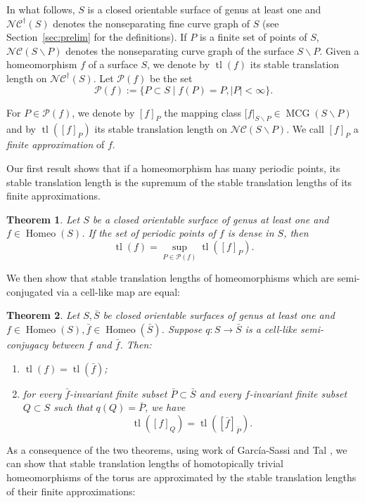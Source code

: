 \documentclass{amsart}
\newcommand{\Pf}{\mathcal{P}}
\newcommand{\st}{\;|\;}
\newcommand{\NC}{\mathcal{NC}}
\newcommand{\NCdagger}{\NC^\dagger}
\DeclareMathOperator{\Homeo}{Homeo}
\DeclareMathOperator{\mcg}{MCG}
\newcommand{\tl}[1]{\operatorname{tl}(#1)}
\newcommand{\ssm}{\smallsetminus}
\newtheorem{thm}{Theorem}[section]
\theoremstyle{definition}
\begin{document}
In what follows, \(S\) is a closed orientable surface of genus at least one and \(\NCdagger(S)\) denotes the nonseparating fine curve graph of \(S\) (see Section~\ref{sec:prelim} for the definitions). If \(P\) is a finite set of points of \(S\), \(\NC(S\ssm P)\) denotes the nonseparating curve graph of the surface \(S\ssm P\). Given a homeomorphism \(f\) of a surface \(S\), we denote by \(\tl{f}\) its stable translation length on \(\NCdagger(S)\). Let \(\Pf(f)\) be the set
\[\Pf(f):=\{P\subset S\st f(P)=P, |P|<\infty\}.\]

For \(P\in\Pf(f)\), we denote by \([f]_P\) the mapping class \([f|_{S\ssm P}\in\mcg(S\ssm P)\) and by \(\tl{[f]_{P}}\) its stable translation length on \(\NC(S\ssm P)\). We call \([f]_P\) a \emph{finite approximation} of \(f\).

Our first result shows that if a homeomorphism has many periodic points, its stable translation length is the supremum of the stable translation lengths of its finite approximations.

\begin{thm}\label{thm:dense}
Let \(S\) be a closed orientable surface of genus at least one and \(f\in\Homeo(S)\). If the set of periodic points of \(f\) is dense in \(S\), then 
    \[\tl{f}=\sup_{P\in\Pf(f)}\tl{[f]_{P}}.\]
\end{thm}

We then show that stable translation lengths of homeomorphisms which are semi-conjugated via a cell-like map are equal:

\begin{thm}    \label{thm:semi-conjugacy}
Let \(S,\bar{S}\) be closed orientable surfaces of genus at least one and \(f\in\Homeo(S), \bar{f}\in\Homeo(\bar{S})\). Suppose \(q:S\to \bar{S}\) is a cell-like semi-conjugacy between \(f\) and \(\bar{f}\). Then:
    \begin{enumerate}
        \item \(\tl{f}=\tl{\bar{f}}\);
        \item for every \(\bar{f}\)-invariant finite subset \(\bar{P}\subset \bar{S}\) and every \(f\)-invariant  finite subset \(Q\subset S\) such that \(q(Q)=\bar{P}\), we have
    \[\tl{[f]_{Q}}=\tl{[\bar{f}]_{\bar{P}}}.\]
    \end{enumerate}
\end{thm}

As a consequence of the two theorems, using work of García-Sassi and Tal \cite{gst_fully}, we can show that stable translation lengths of homotopically trivial homeomorphisms of the torus are approximated by the stable translation lengths of their finite approximations:
\end{document}
